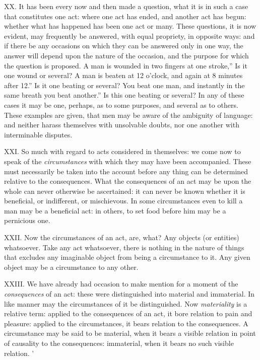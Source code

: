 \documentclass[12pt]{report}
\begin{document}
XX. It has been every now and then made a question, what it is in such a
case that constitutes one act: where one act has ended, and another act
has begun: whether what has happened has been one act or many. These
questions, it is now evident, may frequently be answered, with equal
propriety, in opposite ways: and if there be any occasions on which they
can be answered only in one way, the answer will depend upon the nature
of the occasion, and the purpose for which the question is proposed. A
man is wounded in two fingers at one stroke,'' Is it one wound
or several? A man is beaten at 12 o'clock, and again at 8 minutes after
12.'' Is it one beating or several? You beat one man, and
instantly in the same breath you beat another.'' Is this one
beating or several? In any of these cases it may be one, perhaps, as to
some purposes, and several as to others. These examples are given, that
men may be aware of the ambiguity of language: and neither harass
themselves with unsolvable doubts, nor one another with interminable
disputes.

XXI. So much with regard to acts considered in themselves: we come now
to speak of the \emph{circumstances} with which they may have been
accompanied. These must necessarily be taken into the account before any
thing can be determined relative to the consequences. What the
consequences of an act may be upon the whole can never otherwise be
ascertained: it can never be known whether it is beneficial, or
indifferent, or mischievous. In some circumstances even to kill a man
may be a beneficial act: in others, to set food before him may be a
pernicious one.

XXII. Now the circumstances of an act, are, what? Any objects (or
entities) whatsoever. Take any act whatsoever, there is nothing in the
nature of things that excludes any imaginable object from being a
circumstance to it. Any given object may be a circumstance to any other.

XXIII. We have already had occasion to make mention for a moment of the
\emph{consequences} of an act: these were distinguished into material
and immaterial. In like manner may the circumstances of it be
distinguished. Now \emph{materiality} is a relative term: applied to the
consequences of an act, it bore relation to pain and pleasure: applied
to the circumstances, it bears relation to the consequences. A
circumstance may be said to be material, when it bears a visible
relation in point of causality to the consequences: immaterial, when it
bears no such visible relation. '
\end{document}
